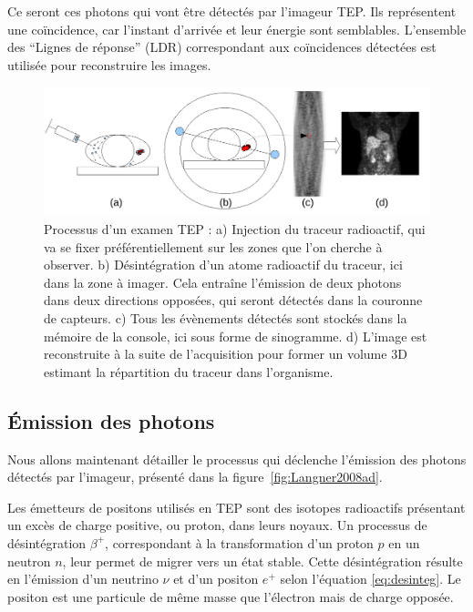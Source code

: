 Ce seront ces photons qui vont être détectés par l'imageur TEP. Ils représentent une coïncidence, car l'instant d'arrivée et leur énergie sont semblables. L'ensemble des ``Lignes de réponse'' (LDR) correspondant aux coïncidences détectées est utilisée pour reconstruire les images.

\begin{figure}
\centering
\includegraphics[width=16cm]{images/schemaTEP}
\caption[Présentation simplifiée de la TEP]{Processus d'un examen TEP : a) Injection du traceur radioactif, qui va se fixer préférentiellement sur les zones que l'on cherche à observer. b) Désintégration d'un atome radioactif du traceur, ici dans la zone à imager. Cela entraîne l'émission de deux photons dans deux directions opposées, qui seront détectés dans la couronne de capteurs. c) Tous les évènements détectés sont stockés dans la mémoire de la console, ici sous forme de sinogramme. d) L'image est reconstruite à la suite de l'acquisition pour former un volume 3D estimant la répartition du traceur dans l'organisme.}
\label{fig:schemaTEP}
\end{figure}

	\subsection{\'Emission des photons}

Nous allons maintenant détailler le processus qui déclenche l'émission des photons détectés par l'imageur, présenté dans la figure~\ref{fig:Langner2008ad}.

Les émetteurs de positons utilisés en TEP sont des isotopes radioactifs présentant un excès de charge positive, ou proton, dans leurs noyaux. Un processus de désintégration $\beta^+$, correspondant à la transformation d’un proton $p$ en un neutron $n$, leur permet de migrer vers un état stable. Cette désintégration résulte en l’émission d’un neutrino $\nu$ et d’un positon $e^+$ selon l’équation \ref{eq:desinteg}. Le positon est une particule de même masse que l’électron mais de charge opposée.

